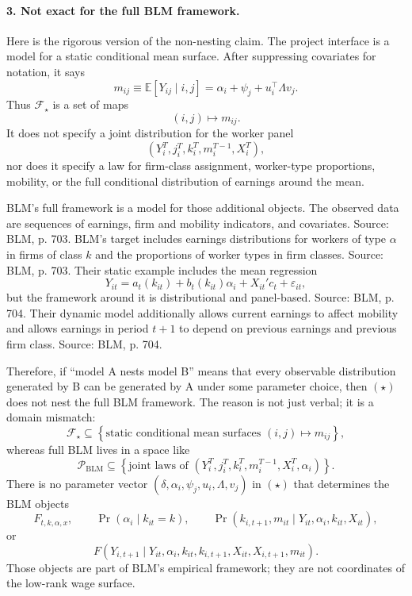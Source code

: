 ﻿\documentclass[11pt]{article}
\newcommand{\E}{\mathbb{E}}
\newcommand{\1}{\mathbf{1}}
\begin{document}
\paragraph{3. Not exact for the full BLM framework.}
Here is the rigorous version of the non-nesting claim. The project interface is
a model for a static conditional mean surface. After suppressing covariates for
notation, it says
\[
m_{ij}
\equiv
\E[Y_{ij}\mid i,j]
=
\alpha_i+\psi_j+u_i^\top\Lambda v_j.
\tag{LR-mean}
\]
Thus $\mathcal F_\star$ is a set of maps
\[
(i,j)\mapsto m_{ij}.
\]
It does not specify a joint distribution for the worker panel
\[
\left(Y_i^T,j_i^T,k_i^T,m_i^{T-1},X_i^T\right),
\]
nor does it specify a law for firm-class assignment, worker-type proportions,
mobility, or the full conditional distribution of earnings around the mean.

BLM's full framework is a model for those additional objects. The observed data
are sequences of earnings, firm and mobility indicators, and covariates. Source:
BLM, p. 703. BLM's target includes earnings distributions for workers of type
$\alpha$ in firms of class $k$ and the proportions of worker types in firm
classes. Source: BLM, p. 703. Their static example includes the mean regression
\[
Y_{it}=a_t(k_{it})+b_t(k_{it})\alpha_i+X_{it}'c_t+\varepsilon_{it},
\]
but the framework around it is distributional and panel-based. Source: BLM,
p. 704. Their dynamic model additionally allows current earnings to affect
mobility and allows earnings in period $t+1$ to depend on previous earnings and
previous firm class. Source: BLM, p. 704.

Therefore, if ``model A nests model B'' means that every observable distribution
generated by B can be generated by A under some parameter choice, then
$(\star)$ does not nest the full BLM framework. The reason is not just verbal; it
is a domain mismatch:
\[
\mathcal F_\star
\subseteq
\left\{\text{static conditional mean surfaces }(i,j)\mapsto m_{ij}\right\},
\]
whereas full BLM lives in a space like
\[
\mathcal P_{\mathrm{BLM}}
\subseteq
\left\{
\text{joint laws of }(Y_i^T,j_i^T,k_i^T,m_i^{T-1},X_i^T,\alpha_i)
\right\}.
\]
There is no parameter vector $(\delta,\alpha_i,\psi_j,u_i,\Lambda,v_j)$ in
$(\star)$ that determines the BLM objects
\[
F_{t,k,\alpha,x},\qquad
\Pr(\alpha_i\mid k_{it}=k),\qquad
\Pr(k_{i,t+1},m_{it}\mid Y_{it},\alpha_i,k_{it},X_{it}),
\]
or
\[
F(Y_{i,t+1}\mid Y_{it},\alpha_i,k_{it},k_{i,t+1},X_{it},X_{i,t+1},m_{it}).
\]
Those objects are part of BLM's empirical framework; they are not coordinates of
the low-rank wage surface.
\end{document}
